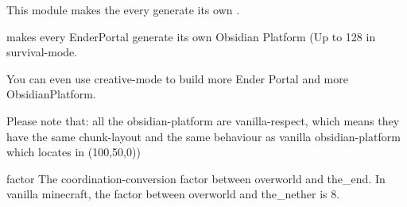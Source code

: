 
This module makes the every  generate its own .

makes every EnderPortal generate its own Obsidian Platform (Up to 128 in survival-mode.

You can even use creative-mode to build more Ender Portal and more ObsidianPlatform.

Please note that: all the obsidian-platform are vanilla-respect, which means they have the same chunk-layout and the same behaviour as vanilla obsidian-platform which locates in (100,50,0))

\begin{Configuration}
    \item[factor]{
        The coordination-conversion factor between overworld and the\_end.
        In vanilla minecraft, the factor between overworld and the\_nether is 8.
    }
\end{Configuration}
